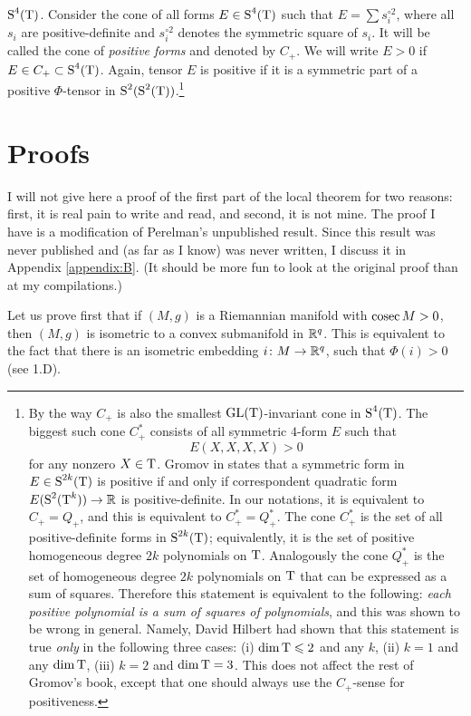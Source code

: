 \documentclass{article}
\begin{document}
\noindent
$\text{\rm S}^4(\text{\rm T})$.
Consider the cone of all forms $E\in \text{\rm S}^4(\text{\rm T})$ such that
$E=\sum s_i^{\circ 2}$, where all $s_i$ are positive-definite and $s_i^{\circ 2}$ denotes the symmetric square of $s_i$.
It will be called the cone of \emph{positive forms} and denoted by $C_+$.
We will write $E>0$
if $E\in C_+\subset \text{\rm S}^4(\text{\rm T})$. Again, tensor $E$ is positive if it is a
symmetric part of a positive $\Phi$-tensor in
$\text{\rm S}^2(\text{\rm S}^2(\text{\rm T}))$.\footnote{By the way $C_+$ is also the
smallest $\mathrm{GL}(\text{\rm T})$-invariant cone in $\text{\rm S}^4(\text{\rm T})$. The biggest such cone
$C^*_+$ consists of all symmetric $4$-form $E$ such that
$$E(X,X,X,X)>0$$ for any nonzero $X\in \text{\rm T}$. 
Gromov in
\cite[3.1.4]{Grom-PDR} states that a symmetric form in
$E\in \text{\rm S}^{2k}(\text{\rm T})$ is positive if and only if correspondent
quadratic form $E(\text{\rm S}^2(\text{\rm T}^k))\to \mathbb{R}$ is positive-definite.
In our notations, it is equivalent to $C_+=Q_+$, and
this is equivalent to $C_+^*=Q_+^*$. 
The cone $C_+^*$ is the set of all positive-definite  forms in $\text{\rm S}^{2k}(\text{\rm T})$;
equivalently, it is the set of positive homogeneous degree $2k$ polynomials on $\text{\rm T}$.
Analogously the cone $Q_+^*$ is the set of homogeneous degree $2k$ polynomials on $\text{\rm T}$ that can be expressed as a sum of squares.
Therefore this statement is equivalent to the following: \textit{each positive
polynomial is a sum of squares of polynomials}, and this was shown to be wrong in general.
Namely, David Hilbert \cite{Hil} had shown that this statement is true \textit{only} in the following three cases: (i)
$\mathop{\rm dim}\nolimits \text{\rm T}\leqslant 2$ and any $k$,
(ii) $k=1$ and any $\mathop{\rm dim}\nolimits \text{\rm T}$,
(iii) $k=2$ and $\mathop{\rm dim}\nolimits \text{\rm T}=3$.
This does not affect the rest of Gromov's book, except that one should always use the $C_+$-sense for positiveness.}


\section{Proofs}


I will not give here a proof of the first part of the local theorem for two reasons: first, it is real pain to write and read, and second, it is not mine.
The proof I have is a modification of Perelman's unpublished result.
Since this result was never published and (as far as I know) was never written,
I discuss it in Appendix \ref{appendix:B}.
(It should be more fun to look at the original proof than at my compilations.)


Let us prove first that
if $(M,g)$ is a Riemannian manifold with $\mathop{\rm cosec}\nolimits M>0$,
then $(M,g)$ is isometric to a convex submanifold in $\mathbb{R}^q$.
This is equivalent to the fact that there is an isometric embedding
$i\colon M\to \mathbb{R}^q$, such that
$\Phi(i)>0$ (see 1.D).
\end{document}
